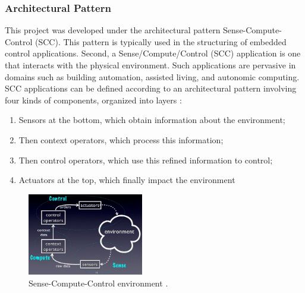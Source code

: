 \documentclass{acm_proc_article-sp}
\begin{document}
\subsubsection{Architectural Pattern}
This project was developed under the architectural pattern Sense-Compute-Control (SCC). This pattern is typically used in the structuring of embedded control applications. Second\cite{taylor2009software}, a Sense/Compute/Control (SCC) application is one that interacts with the physical environment. Such applications are pervasive in domains such as building automation, assisted living, and autonomic computing. SCC applications can be defined according to an architectural pattern involving four kinds of components, organized into layers \cite{edwards2009architecture}: 
\begin{enumerate}
\item Sensors at the bottom, which obtain information about the environment; 
\item Then context operators, which process this information; 
\item Then control operators, which use this refined information to control;
\item Actuators at the top, which finally impact the environment
\end{enumerate}

\begin{figure}[h]
    \includegraphics[width=0.45\textwidth,natwidth=610,natheight=642]{pictures/senseComputeControl.png}
    \caption{Sense-Compute-Control environment \protect\cite{DamienCassou}.}
    \label{fig:scc}
\end{figure}
\end{document}
